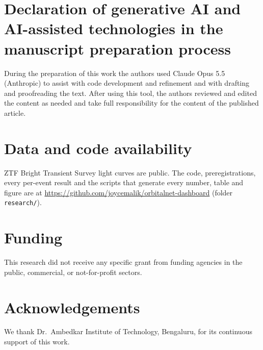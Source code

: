 \documentclass[final,5p,times,twocolumn,authoryear]{elsarticle}
\begin{document}
\section*{Declaration of generative AI and AI-assisted technologies in the manuscript preparation process}
During the preparation of this work the authors used Claude Opus 5.5 (Anthropic) to assist with code development and refinement and with drafting and proofreading the text. After using this tool, the authors reviewed and edited the content as needed and take full responsibility for the content of the published article.

\section*{Data and code availability}
ZTF Bright Transient Survey light curves are public. The code, preregistrations, every per-event result and the scripts that generate every number, table and figure are at \url{https://github.com/joycemalik/orbitalnet-dashboard} (folder \texttt{research/}).

\section*{Funding}
This research did not receive any specific grant from funding agencies in the public, commercial, or not-for-profit sectors.

\section*{Acknowledgements}
We thank Dr.\ Ambedkar Institute of Technology, Bengaluru, for its continuous support of this work.


\end{document}
